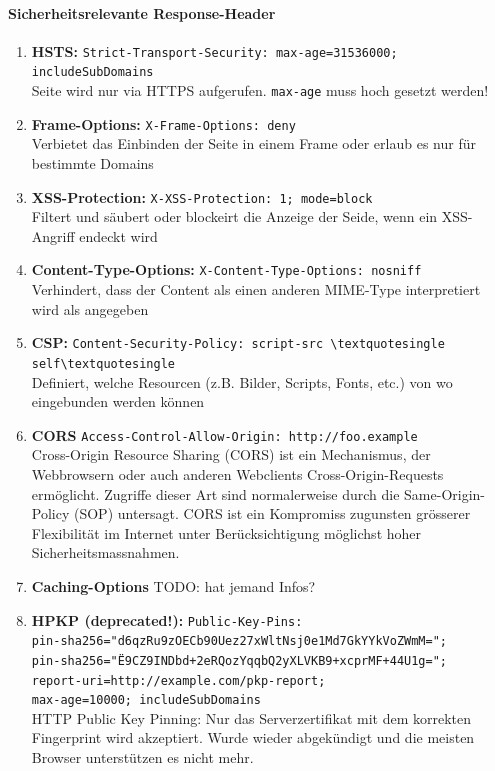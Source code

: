 \documentclass[10pt,a4paper]{article}
\begin{document}
\paragraph*{Sicherheitsrelevante Response-Header}
\begin{enumerate}[noitemsep,topsep=0pt,leftmargin=*]
    \item \textbf{HSTS:} \verb|Strict-Transport-Security: max-age=31536000; includeSubDomains|\\
    Seite wird nur via HTTPS aufgerufen. \verb|max-age| muss hoch gesetzt werden!
    \item \textbf{Frame-Options:} \verb|X-Frame-Options: deny|\\
    Verbietet das Einbinden der Seite in einem Frame oder erlaub es nur für bestimmte Domains
    \item \textbf{XSS-Protection:} \verb|X-XSS-Protection: 1; mode=block|\\
    Filtert und säubert oder blockeirt die Anzeige der Seide, wenn ein XSS-Angriff endeckt wird
    \item \textbf{Content-Type-Options:} \verb|X-Content-Type-Options: nosniff|\\
    Verhindert, dass der Content als einen anderen MIME-Type interpretiert wird als angegeben
    \item \textbf{CSP:} \verb|Content-Security-Policy: script-src \textquotesingle self\textquotesingle|\\
    Definiert, welche Resourcen (z.B. Bilder, Scripts, Fonts, etc.) von wo eingebunden werden können
    \item \textbf{CORS} \verb|Access-Control-Allow-Origin: http://foo.example|\\
    Cross-Origin Resource Sharing (CORS) ist ein Mechanismus, der Webbrowsern oder auch anderen Webclients Cross-Origin-Requests ermöglicht. Zugriffe dieser Art sind normalerweise durch die Same-Origin-Policy (SOP) untersagt. CORS ist ein Kompromiss zugunsten grösserer Flexibilität im Internet unter Berücksichtigung möglichst hoher Sicherheitsmassnahmen.
    \item \textbf{Caching-Options} {\color{red}TODO: hat jemand Infos?}
    \item \textbf{HPKP ({\color{red}deprecated!}):}
    \verb|Public-Key-Pins:|\\
    \verb|pin-sha256="d6qzRu9zOECb90Uez27xWltNsj0e1Md7GkYYkVoZWmM=";|\\
    \verb|pin-sha256="Ë9CZ9INDbd+2eRQozYqqbQ2yXLVKB9+xcprMF+44U1g=";|\\
    \verb|report-uri=http://example.com/pkp-report;|\\
    \verb|max-age=10000; includeSubDomains|\\
    HTTP Public Key Pinning: Nur das Serverzertifikat mit dem korrekten Fingerprint wird akzeptiert. Wurde wieder abgekündigt und die meisten Browser unterstützen es nicht mehr.
\end{enumerate}
\end{document}
